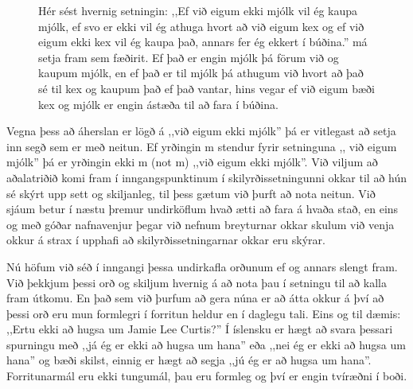 \vspace{5pt}
\begin{figure}[H]
	\centering
{}
\caption{Hér sést hvernig setningin: ,,Ef við eigum ekki mjólk vil ég kaupa mjólk, ef svo er ekki vil ég athuga hvort að við eigum kex og ef við eigum ekki kex vil ég kaupa það, annars fer ég ekkert í búðina.'' má setja fram sem fæðirit. Ef það er engin mjólk þá förum við og kaupum mjólk, en ef það er til mjólk þá athugum við hvort að það sé til kex og kaupum það ef það vantar, hins vegar ef við eigum bæði kex og mjólk er engin ástæða til að fara í búðina.}
\label{fig:flæðirit}
\end{figure}

\vspace{5pt}

Vegna þess að áherslan er lögð á ,,við eigum ekki mjólk'' þá er vitlegast að setja inn segð sem er með neitun.
Ef yrðingin m stendur fyrir setninguna ,, við eigum mjólk'' þá er yrðingin ekki m (not m) ,,við eigum ekki mjólk''.
Við viljum að aðalatriðið komi fram í inngangspunktinum í skilyrðissetningunni okkar til að hún sé skýrt upp sett og skiljanleg, til þess gætum við þurft að nota neitun.
Við sjáum betur í næstu þremur undirköflum hvað ætti að fara á hvaða stað, en eins og með góðar nafnavenjur þegar við nefnum breyturnar okkar skulum við venja okkur á strax í upphafi að skilyrðissetningarnar okkar eru skýrar.

Nú höfum við séð í inngangi þessa undirkafla orðunum ef og annars slengt fram.
Við þekkjum þessi orð og skiljum hvernig á að nota þau í setningu til að kalla fram útkomu.
En það sem við þurfum að gera núna er að átta okkur á því að þessi orð eru mun formlegri í forritun heldur en í daglegu tali.
Eins og til dæmis: ,,Ertu ekki að hugsa um Jamie Lee Curtis?''
Í íslensku er hægt að svara þessari spurningu með ,,já ég er ekki að hugsa um hana'' eða ,,nei ég er ekki að hugsa um hana'' og bæði skilst, einnig er hægt að segja ,,jú ég er að hugsa um hana''.
Forritunarmál eru ekki tungumál, þau eru formleg og því er engin tvíræðni í boði.


